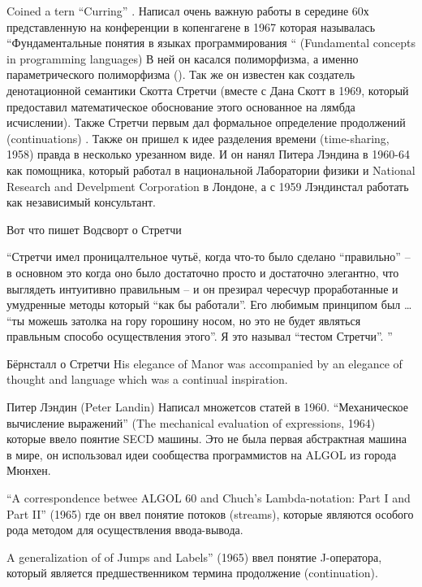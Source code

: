 \documentclass[14pt]{matmex-diploma-custom}
\begin{document}
Coined a tern “Curring” . Написал очень важную работы в середине 60х представленную на конференции в копенгагене в 1967 которая называлась  “Фундаментальные понятия в языках программирования “ (Fundamental concepts in programming languages) В ней он касался полиморфизма, а именно параметрического полиморфизма (). Так же он известен как создатель денотационной семантики Скотта Стретчи (вместе с Дана Скотт в 1969, который предоставил математическое обоснование этого основанное на лямбда исчислении). Также Стретчи первым дал формальное определение продолжений (continuations) . Также он пришел к идее разделения времени (time-sharing, 1958) правда в несколько урезанном виде. И он нанял Питера Лэндина  в 1960-64 как помощника, который работал в национальной Лаборатории физики и National Research and Develpment Corporation  в Лондоне, а с 1959 Лэндинстал  работать как независимый консультант. 

\begin{framed}
Вот что пишет Водсворт о Стретчи

“Стретчи имел проницалтельное чутьё, когда что-то было сделано “правильно” -- в основном это когда оно было достаточно просто и достаточно элегантно, что выглядеть интуитивно правильным -- и он презирал чересчур проработанные  и умудренные методы который “как бы работали”. Его любимым принципом был … “ты можешь затолка   на гору горошину носом, но это не будет являться правльным способо осуществления этого”. Я это называл “тестом Стретчи”.
”
\end{framed}
\begin{framed}
Бёрнсталл о Стретчи
His elegance of Manor was accompanied by an elegance of thought and language which was a continual inspiration.
\end{framed}

Питер Лэндин (Peter Landin)
Написал множетсов статей в 1960.
“Механическое вычисление выражений” (The mechanical evaluation of expressions, 1964) которые ввело поянтие SECD машины. Это не была  первая абстрактная машина в мире, он использовал идеи сообщества программистов на ALGOL из города Мюнхен. 

“A correspondence betwee ALGOL 60 and Chuch’s Lambda-notation: Part I and Part II” (1965) где он ввел понятие потоков (streams), которые являются особого рода методом для осуществления ввода-вывода.

A generalization of of Jumps and Labels” (1965) ввел понятие J-оператора, который является предшественником термина продолжение (continuation).
\end{document}
